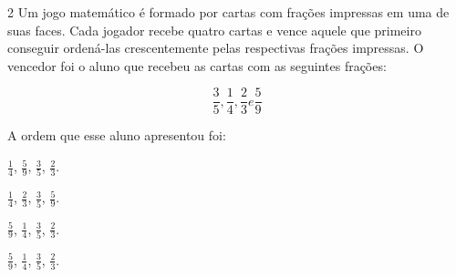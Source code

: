 
\num{2}  Um jogo matemático é formado por cartas com frações impressas em uma
de suas faces. Cada jogador recebe quatro cartas e vence aquele que
primeiro conseguir ordená-las crescentemente pelas respectivas frações
impressas. O vencedor foi o aluno que recebeu as cartas com as seguintes frações:

$$\frac{3}{5}, \frac{1}{4}, \frac{2}{3} e \frac{5}{9}$$

A ordem que esse aluno apresentou foi:

\begin{escolha}
\item $\frac{1}{4}$, $\frac{5}{9}$, $\frac{3}{5}$, $\frac{2}{3}$.
\item $\frac{1}{4}$, $\frac{2}{3}$, $\frac{3}{5}$, $\frac{5}{9}$.
\item $\frac{5}{9}$, $\frac{1}{4}$, $\frac{3}{5}$, $\frac{2}{3}$.
\item $\frac{5}{9}$, $\frac{1}{4}$, $\frac{3}{5}$, $\frac{2}{3}$.
\end{escolha}





